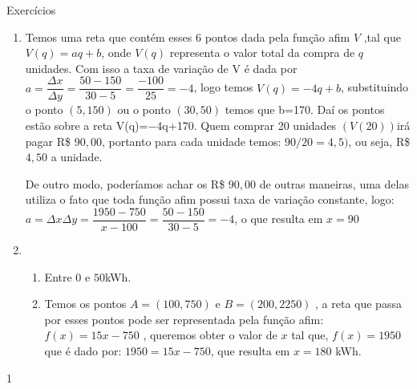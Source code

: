 \exercise

\begin{answer}{Exercícios}
{\exerciselist
\begin{enumerate}
\item Temos uma reta que contém esses 6 pontos dada pela função afim $V$ ,tal que $V(q)=aq+b$, onde $V(q)$ representa o valor total da compra de $q$ unidades. Com isso a taxa de variação de V é dada por $a=\dfrac{\Delta x}{\Delta y}=\dfrac{50-150}{30-5}=\dfrac{-100}{25}=-4$, logo temos $V(q)=-4q+b$, substituindo o ponto $(5,150)$ ou o ponto $(30,50)$ temos que b=170. Daí os pontos estão sobre a reta V(q)=−4q+170. Quem comprar 20 unidades $(V(20))$irá pagar R\$ $90{,}00$, portanto para cada unidade temos: $90/20=4{,}5)$, ou seja, R\$ $4{,}50$ a unidade.

De outro modo, poderíamos achar os R\$ $90{,}00$ de outras maneiras, uma delas utiliza o fato que toda função afim possui taxa de variação constante, logo: $a=\Delta x\Delta y=\dfrac{1950-750}{x-100}=\dfrac{50-150}{30-5}=-4$, o que resulta em $x=90$

\item 
\begin{enumerate}
\item Entre $0$ e $50$kWh.

\item Temos os pontos $A=(100,750)$ e $B=(200,2250)$ , a reta que passa por esses pontos pode ser representada pela função afim: $f(x)=15x-750$ , queremos obter o valor de $x$ tal que, $f(x)=1950$ que é dado por: $1950=15x-750$, que resulta em $x=180$ kWh.
\end{enumerate}

\end{enumerate}
}{1}
\end{answer}


